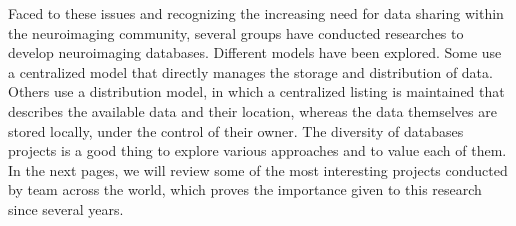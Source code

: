 \par
Faced to these issues and recognizing the increasing need for data sharing within the neuroimaging community, several groups have conducted researches to develop neuroimaging databases. Different models have been explored. Some use a centralized model that directly manages the storage and distribution of data. Others use a distribution model, in which a centralized listing is maintained that describes the available data and their location, whereas the data themselves are stored locally, under the control of their owner. The diversity of databases projects is a good thing to explore various approaches and to value each of them. In the next pages, we will review some of the most interesting projects conducted by team across the world, which proves the importance given to this research since several years. 

